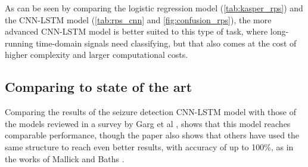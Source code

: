 As can be seen by comparing the logistic regression model (\cref{tab:kasper_rps}) and the CNN-LSTM model (\cref{tab:rps_cnn} and \cref{fig:confusion_rps}), the more advanced CNN-LSTM model is better suited to this type of task, where long-running time-domain signals need classifying, but that also comes at the cost of higher complexity and larger computational costs. 
\subsection{Comparing to state of the art}
Comparing the results of the seizure detection CNN-LSTM model with those of the models reviewed in a survey by Garg et al \cite{review}, shows that this model reaches comparable performance, though the paper also shows that others have used the same structure to reach even better results, with accuracy of up to 100\%, as in the works of Mallick and Baths \cite{CLSTM}.



